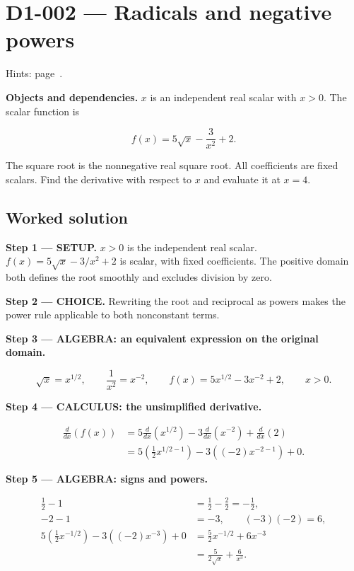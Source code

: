 \documentclass[11pt,oneside,openany]{book}
\begin{document}
\section{D1-002 --- Radicals and negative powers}
\label{problem:D1-002}
{\small Hints: page~\pageref{hints:D1-002}.}\par\medskip

\textbf{Objects and dependencies.} \(x\) is an independent real scalar with \(x>0\).
The scalar function is

\[
f(x)=5\sqrt{x}-\frac{3}{x^2}+2.
\]

The square root is the nonnegative real square root. All coefficients are fixed
scalars. Find the derivative with respect to \(x\) and evaluate it at \(x=4\).
\subsection*{Worked solution}

\textbf{Step 1 --- SETUP.} \(x>0\) is the independent real scalar.
\(f(x)=5\sqrt{x}-3/x^2+2\) is scalar, with fixed coefficients. The positive domain
both defines the root smoothly and excludes division by zero.

\begin{ChoiceStep}
\textbf{Step 2 --- CHOICE.} Rewriting the root and reciprocal as powers makes the power
rule applicable to both nonconstant terms.

\end{ChoiceStep}
\begingroup\color{AlgebraBlue}
\textbf{Step 3 --- ALGEBRA: an equivalent expression on the original domain.}

\[
\sqrt{x}=x^{1/2},\qquad \frac{1}{x^2}=x^{-2},\qquad
f(x)=5x^{1/2}-3x^{-2}+2,\qquad x>0.
\]

\endgroup
\textbf{Step 4 --- CALCULUS: the unsimplified derivative.}

\[
\begin{aligned}
\frac{d}{dx}\left(f(x)\right)
&=5\frac{d}{dx}\left(x^{1/2}\right)
-3\frac{d}{dx}\left(x^{-2}\right)
+\frac{d}{dx}\left(2\right)\\
&=5\left(\frac12 x^{1/2-1}\right)
-3\left((-2)x^{-2-1}\right)+0.
\end{aligned}
\]

\begingroup\color{AlgebraBlue}
\textbf{Step 5 --- ALGEBRA: signs and powers.}

\[
\begin{aligned}
\frac12-1&=\frac12-\frac22=-\frac12,\\
-2-1&=-3,\qquad (-3)(-2)=6,\\
5\left(\frac12 x^{-1/2}\right)-3\left((-2)x^{-3}\right)+0
&=\frac52 x^{-1/2}+6x^{-3}\\
&=\frac{5}{2\sqrt{x}}+\frac{6}{x^3}.
\end{aligned}
\]
\end{document}
